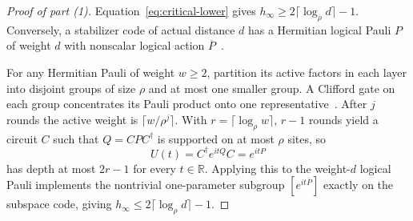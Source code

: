 \documentclass[aps,prl,reprint,longbibliography,nofootinbib,nobibnotes]{revtex4-2}
\begin{document}
\begin{proof}[Proof of part (1)]
Equation~\eqref{eq:critical-lower} gives $h_\infty\ge2\lceil\log_\rho d\rceil-1$. Conversely, a
stabilizer code of actual distance $d$ has a Hermitian logical Pauli $P$ of weight $d$ with
nonscalar logical action $\overline P$~\cite[Sec.~3.2]{GottesmanStabilizer}.

For any Hermitian Pauli of weight $w\ge2$, partition its active factors in each layer into disjoint
groups of size $\rho$ and at most one smaller group. A Clifford gate on each group concentrates its
Pauli product onto one representative~\cite{BonetMonroig,Cowtan,HaahLiuTan}. After $j$ rounds the
active weight is $\lceil w/\rho^j\rceil$. With $r=\lceil\log_\rho w\rceil$, $r-1$ rounds yield a
circuit $C$ such that $Q=CPC^\dagger$ is supported on at most $\rho$ sites, so
\begin{equation}\label{eq:pauli-family}
 U(t)=C^\dagger e^{itQ}C=e^{itP}
\end{equation}
has depth at most $2r-1$ for every $t\in\mathbb R$. Applying this to the weight-$d$ logical Pauli
implements the nontrivial one-parameter subgroup $[e^{it\overline P}]$ exactly on the subspace
code, giving $h_\infty\le 2\lceil\log_\rho d\rceil-1$.
\end{proof}
\end{document}
